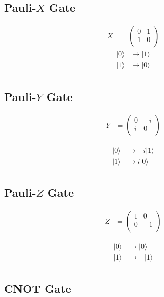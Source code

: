 \documentclass[book.tex]{subfiles}
\begin{document}
\subsection{Pauli-$X$ Gate}
\begin{align}
    X &= \begin{pmatrix}
    0 & 1 \\
    1 & 0 \\
    \end{pmatrix}
\end{align}
\begin{align}
    |0 \rangle & \to | 1 \rangle \\
    |1 \rangle & \to | 0 \rangle \\
\end{align}
\subsection{Pauli-$Y$ Gate}

\begin{align}
    Y &= \begin{pmatrix}
    0 & -i \\
    i & 0 \\
    \end{pmatrix}
\end{align}

\begin{align}
    |0 \rangle &\to -i |1 \rangle \\
    |1 \rangle &\to i | 0 \rangle \\
\end{align}

\subsection{Pauli-$Z$ Gate}

\begin{align}
    Z &= \begin{pmatrix}
    1 & 0 \\
    0 & -1 \\
    \end{pmatrix}
\end{align}

\begin{align}
    |0 \rangle &\to |0 \rangle \\
    |1 \rangle &\to -|1 \rangle \\
\end{align}

\subsection{CNOT Gate}
\end{document}
